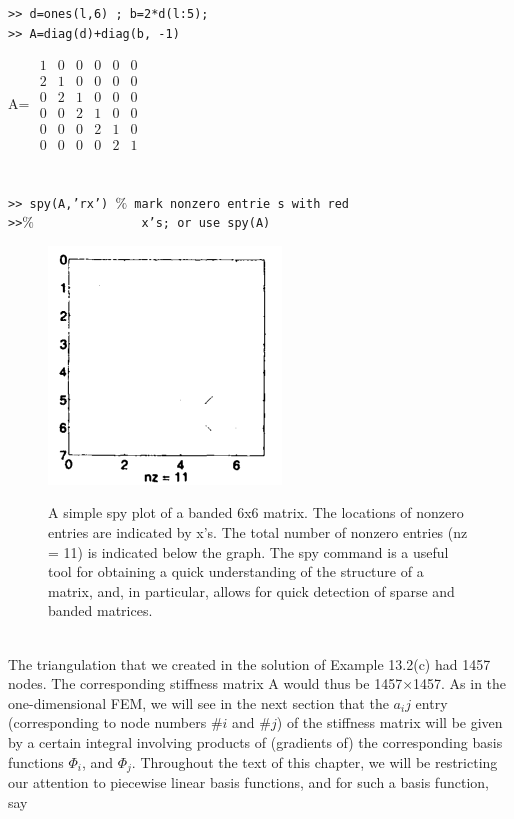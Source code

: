 \documentclass[../main.tex]{subfiles}
\begin{document}
\begin{lstlisting}[numbers=none,frame=none]
>> d=ones(l,6) ; b=2*d(l:5);
>> A=diag(d)+diag(b, -1) 
\end{lstlisting}

A=  $\begin{array}{cccccc}
	1&0&0&0&0&0\\
	2&1&0&0&0&0\\
	0&2&1&0&0&0\\
	0&0&2&1&0&0\\	
	0&0&0&2&1&0\\
	0&0&0&0&2&1
\end{array}$
\\
\\
\\
\texttt{>> spy(A,'rx') $\%$ mark nonzero entrie s with red}\\
	\texttt{>>$\%$~~~~~~~~~~~~~~ x's; or use spy(A)}
\begin{figure}[h]
\includegraphics[width=0.4\linewidth]{3}
	\centering
	\label{pfig:ch13_1}
	\caption{\textsf{	
	A simple spy plot of a banded 6x6 matrix. 
The locations of nonzero entries are indicated by x's. The 
total number of nonzero entries (nz = 11) is indicated below 
the graph. The spy command is a useful tool for obtaining a 
quick understanding of the structure of a matrix, and, in 
particular, allows for quick detection of sparse and banded 
matrices.}}
\end{figure}
\\
The triangulation that we created in the solution of Example 13.2(c) had 1457 
nodes. The corresponding stiffness matrix A would thus be 1457$\times$1457. As in 
the one-dimensional FEM, we will see in the next section that the $a_ij$ entry (corresponding to node numbers $\#i$ and $\#j$) of the stiffness matrix will be given by 
a certain integral involving products of (gradients of) the corresponding basis 
functions $\Phi_i$, and $\Phi_j$. Throughout the text of this chapter, we will be restricting 
our attention to piecewise linear basis functions, and for such a basis function, say 
\end{document}
